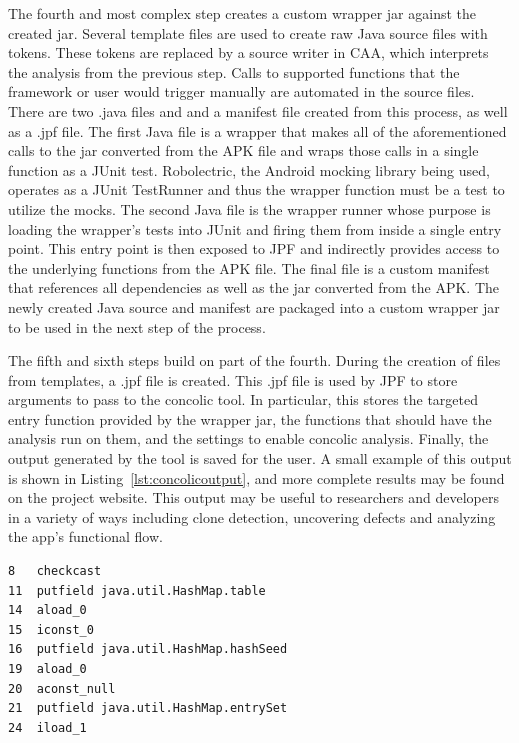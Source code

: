 \documentclass{sig-alternate}
\begin{document}
The fourth and most complex step creates a custom wrapper jar against the created jar. Several template files are used to create raw Java source files with tokens.  These tokens are replaced by a source writer in CAA, which interprets the analysis from the previous step.  Calls to supported functions that the framework or user would trigger manually are automated in the source files.  There are two .java files and and a manifest file created from this process, as well as a .jpf file. The first Java file is a wrapper that makes all of the aforementioned calls to the jar converted from the APK file and wraps those calls in a single function as a JUnit test. Robolectric, the Android mocking library being used, operates as a JUnit TestRunner and thus the wrapper function must be a test to utilize the mocks. The second Java file is the wrapper runner whose purpose is loading the wrapper's tests into JUnit and firing them from inside a single entry point. This entry point is then exposed to JPF and indirectly provides access to the underlying functions from the APK file.  The final file is a custom manifest that references all dependencies as well as the jar converted from the APK.  The newly created Java source and manifest are packaged into a custom wrapper jar to be used in the next step of the process.

The fifth and sixth steps build on part of the fourth. During the creation of files from templates, a .jpf file is created. This .jpf file is used by JPF to store arguments to pass to the concolic tool. In particular, this stores the targeted entry function provided by the wrapper jar, the functions that should have the analysis run on them, and the settings to enable concolic analysis. Finally, the output generated by the tool is saved for the user. A small example of this output is shown in Listing~\ref{lst:concolicoutput}, and more complete results may be found on the project website. This output may be useful to researchers and developers in a variety of ways including clone detection, uncovering defects and analyzing the app's functional flow. 



\begin{lstlisting}[label=lst:concolicoutput, caption=Example Concolic Output]
8   checkcast
11  putfield java.util.HashMap.table
14  aload_0
15  iconst_0
16  putfield java.util.HashMap.hashSeed
19  aload_0
20  aconst_null
21  putfield java.util.HashMap.entrySet
24  iload_1
\end{lstlisting}
\end{document}

